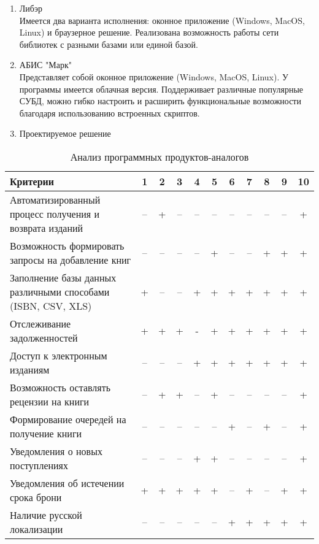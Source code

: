 \documentclass[./intro.tex]{subfiles}
\begin{document}
\begin{enumerate}
    \item Либэр \cite{Liber} \\
    Имеется два варианта исполнения: оконное приложение (Windows, MacOS, Linux) и браузерное решение. Реализована возможность работы сети библиотек с разными базами или единой базой.
    \item АБИС "Марк" \cite{ABISmark} \\
    Представляет собой оконное приложение (Windows, MacOS, Linux). У программы имеется облачная версия. Поддерживает различные популярные СУБД, можно гибко настроить и расширить функциональные возможности благодаря использованию встроенных скриптов.
    \item Проектируемое решение
\end{enumerate}

\begin{table}[h]
    \caption{Анализ программных продуктов-аналогов}
    \label{table:1}
    \begin{tabular}{|p{8.5cm}|c|c|c|c|c|c|c|c|c|c|}
        \hline
        Критерии & 1 & 2 & 3 & 4 & 5 & 6 & 7 & 8 & 9 & 10\\
        \hline
        Автоматизированный процесс получения и возврата изданий & – & + & – & – & – & – & – & – & – & + \\
        \hline
        Возможность формировать запросы на добавление книг & – & – & – & – & + & – & – & + & + & + \\
        \hline
        Заполнение базы данных различными способами (ISBN, CSV, XLS) & + & – & – & + & + & + & + & + & + & + \\
        \hline
        Отслеживание задолженностей & + & + & + & - & + & + & + & + & + & + \\
        \hline
        Доступ к электронным изданиям & – & – & – & + & + & + & + & + & + & + \\
        \hline
        Возможность оставлять рецензии на книги & – & + & + & – & + & – & – & – & – & + \\
        \hline
        Формирование очередей на получение книги & – & – & – & – & – & + & – & + & – & + \\
        \hline
        Уведомления о новых поступлениях & – & – & – & + & + & – & – & – & – & + \\
        \hline
        Уведомления об истечении срока брони & + & + & + & + & + & – & + & – & + & + \\
        \hline
        Наличие русской локализации & – & – & – & – & – & + & + & + & + & + \\
        \hline
    \end{tabular}    
\end{table}
\end{document}
